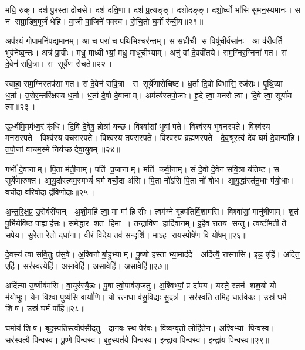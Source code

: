 मयि॒ रुक्। दश॑ पु॒रस्ताद्रोचसे। दश॑ दक्षि॒णा। दश॑ प्र॒त्यङ्ङ्। दशोदङ्ङ्॑। दशो॒र्ध्वो भा॑सि सुमन॒स्यमा॑नः। स न॑ सम्रा॒डिष॒मूर्जं॑ धेहि। वा॒जी वा॒जिने॑ पवस्व। रो॒चि॒तो घ॒र्मो रु॑ची॒य॥२१॥
\anuvakamend[रो॒च॒य॒ धे॒हि॒ नव॑ च]

अप॑श्यं गो॒पामनि॑पद्यमानम्। आ च॒ परा॑ च प॒थिभि॒श्चर॑न्तम्। स स॒ध्रीची॒ स विषू॑ची॒र्वसा॑नः। आ व॑रीवर्ति॒ भुव॑नेष्व॒न्तः। अत्र॑ प्रा॒वीः। मधु॒ माध्वीभ्यां॒ मधु॒ माधू॑चीभ्याम्। अनु॑ वां दे॒ववी॑तये। सम॒ग्निर॒ग्निना॑ गत। सं दे॒वेन॑ सवि॒त्रा। स सूर्ये॑ण रोचते॥२२॥

स्वाहा॒ सम॒ग्निस्तप॑सा गत। सं दे॒वेन॑ सवि॒त्रा। स सूर्ये॑णारोचिष्ट। ध॒र्ता दि॒वो विभा॑सि॒ रज॑सः। पृ॒थि॒व्या ध॒र्ता। उ॒रोर॒न्तरि॑क्षस्य ध॒र्ता। ध॒र्ता दे॒वो दे॒वानाम्। अम॑र्त्यस्तपो॒जाः। हृ॒दे त्वा॒ मन॑से त्वा। दि॒वे त्वा॒ सूर्या॑य त्वा॥२३॥

ऊ॒र्ध्वमि॒मम॑ध्व॒रं कृ॑धि। दि॒वि दे॒वेषु॒ होत्रा॑ यच्छ। विश्वा॑सां भुवां पते। विश्व॑स्य भुवनस्पते। विश्व॑स्य मनसस्पते। विश्व॑स्य वचसस्पते। विश्व॑स्य तपसस्पते। विश्व॑स्य ब्रह्मणस्पते। दे॒व॒श्रूस्त्वं दे॑व घर्म दे॒वान्पा॑हि। त॒पो॒जां वाच॑म॒स्मे निय॑च्छ देवा॒युवम्॥२४॥

गर्भो॑ दे॒वानाम्। पि॒ता म॑ती॒नाम्। पति॑ प्र॒जानाम्। मति॑ कवी॒नाम्। सं दे॒वो दे॒वेन॑ सवि॒त्रा य॑तिष्ट। स सूर्ये॑णारुक्त। आ॒यु॒र्दास्त्वम॒स्मभ्यं॑ घर्म वर्चो॒दा अ॑सि। पि॒ता नो॑ऽसि पि॒ता नो॑ बोध। आ॒यु॒र्द्धास्त॑नू॒धाः प॑यो॒धाः। व॒र्चो॒दा व॑रिवो॒दा द्र॑विणो॒दाः॥२५॥

अ॒न्त॒रि॒क्ष॒प्र॒ उ॒रोर्वरी॑यान्। अ॒शी॒महि॑ त्वा॒ मा मा॑ हिसीः। त्वम॑ग्ने गृ॒हप॑तिर्वि॒शाम॑सि। विश्वा॑सां॒ मानु॑षीणाम्। श॒तं पू॒र्भिर्य॑विष्ठ पा॒ह्यह॑सः। स॒मे॒द्धार श॒त हिमा। त॒न्द्रा॒विण हार्दिवा॒नम्। इ॒हैव रा॒तय॑ सन्तु। त्वष्टी॑मती ते सपेय। सु॒रेता॒ रेतो॒ दधा॑ना। वी॒रं  वि॑देय॒ तव॑ स॒न्दृशि॑। माऽह रा॒यस्पोषे॑ण॒ वि यो॑षम्॥२६॥
\anuvakamend[रो॒च॒ते॒ सूर्या॑य त्वा देवा॒युवं॑ द्रविणो॒दा दधा॑ना॒ द्वे च॑]


दे॒वस्य॑ त्वा सवि॒तुः प्र॑स॒वे। अ॒श्विनोर्बा॒हुभ्याम्। पू॒ष्णो हस्ताभ्या॒माद॑दे। अदि॑त्यै॒ रास्ना॑सि। इड॒ एहि॑। अदि॑त॒ एहि॑। सर॑स्व॒त्येहि॑। असा॒वेहि॑। असा॒वेहि॑। असा॒वेहि॑॥२७॥

अदि॑त्या उ॒ष्णीष॑मसि। वा॒युर॑स्यै॒डः। पू॒षा त्वो॒पाव॑सृजतु। अ॒श्विभ्यां॒ प्र दा॑पय। यस्ते॒ स्तन॑ शश॒यो यो म॑यो॒भूः। येन॒ विश्वा॒ पुष्य॑सि॒ वार्या॑णि। यो र॑त्न॒धा व॑सु॒विद्यः सु॒दत्र॑। सर॑स्वति॒ तमि॒ह धात॑वेकः। उस्र॑ घ॒र्म शिष। उस्र॑ घ॒र्मं पा॑हि॥२८॥

घ॒र्माय॑ शिष। बृह॒स्पति॒स्त्वोप॑सीदतु। दान॑वः स्थ॒ पेर॑वः। वि॒ष्व॒ग्वृतो॒ लोहि॑तेन। अ॒श्विभ्यां पिन्वस्व। सर॑स्वत्यै पिन्वस्व। पू॒ष्णे पि॑न्वस्व। बृह॒स्पत॑ये पिन्वस्व। इन्द्रा॑य पिन्वस्व। इन्द्रा॑य पिन्वस्व॥२९॥

